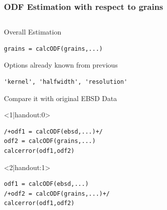 \begin{frame}[fragile]
  \frametitle{ODF Estimation with respect to grains}


\begin{columns}[t]
\begin{column}[T]{8cm}

Overall Estimation

\begin{lstlisting}
grains = calcODF(grains,...)
\end{lstlisting}

\medskip

Options already known from previous
\begin{lstlisting}[basicstyle=\footnotesize]
'kernel', 'halfwidth', 'resolution'
\end{lstlisting}

\medskip

Compare it with original EBSD Data
\begin{onlyenv}<1|handout:0>
\begin{lstlisting}
/+odf1 = calcODF(ebsd,...)+/
odf2 = calcODF(grains,...)
calcerror(odf1,odf2)
\end{lstlisting}
\end{onlyenv}

\begin{onlyenv}<2|handout:1>
\begin{lstlisting}
odf1 = calcODF(ebsd,...)
/+odf2 = calcODF(grains,...)+/
calcerror(odf1,odf2)
\end{lstlisting}
\end{onlyenv}

\end{column}
\begin{column}[T]{3.5cm}
\end{column}
\end{columns}


\end{frame}
